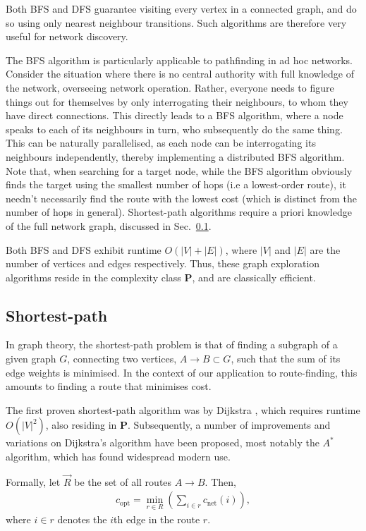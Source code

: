 \documentclass[aps,rmp,twocolumn,amsmath,amssymb,nofootinbib,superscriptaddress]{revtex4}
\begin{document}
Both BFS and DFS guarantee visiting every vertex in a connected graph, and do so using only nearest neighbour transitions. Such algorithms are therefore very useful for network discovery.

The BFS algorithm is particularly applicable to pathfinding in ad hoc networks. Consider the situation where there is no central authority with full knowledge of the network, overseeing network operation. Rather, everyone needs to figure things out for themselves by only interrogating their neighbours, to whom they have direct connections. This directly leads to a BFS algorithm, where a node speaks to each of its neighbours in turn, who subsequently do the same thing. This can be naturally parallelised, as each node can be interrogating its neighbours independently, thereby implementing a distributed BFS algorithm. Note that, when searching for a target node, while the BFS algorithm obviously finds the target using the smallest number of hops (i.e a lowest-order route), it needn't necessarily find the route with the lowest cost (which is distinct from the number of hops in general). Shortest-path algorithms require a priori knowledge of the full network graph, discussed in Sec.~\ref{sec:shortest_path}.

Both BFS and DFS exhibit runtime \mbox{$O(|V|+|E|)$}, where $|V|$ and $|E|$ are the number of vertices and edges respectively. Thus, these graph exploration algorithms reside in the complexity class \textbf{P}, and are classically efficient.

%
%

\subsection{Shortest-path} \label{sec:shortest_path}

In graph theory, the shortest-path problem is that of finding a subgraph of a given graph $G$, connecting two vertices, \mbox{$A\to B \subset G$}, such that the sum of its edge weights is minimised. In the context of our application to route-finding, this amounts to finding a route that minimises cost.

The first proven shortest-path algorithm was by Dijkstra \cite{bib:Dijkstra59}, which requires runtime $O(|V|^2)$, also residing in \textbf{P}. Subsequently, a number of improvements and variations on Dijkstra's algorithm have been proposed, most notably the $A^*$ algorithm, which has found widespread modern use.

Formally, let $\vec{R}$ be the set of all routes \mbox{$A\to B$}. Then,
\begin{align}
c_\mathrm{opt} = \min_{r\in R} \left(\sum_{i\in r} c_\mathrm{net}(i) \right),
\end{align}
where \mbox{$i\in r$} denotes the $i$th edge in the route $r$.
\end{document}
